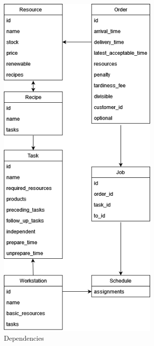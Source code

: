 \documentclass[a4paper,12pt,twoside]{scrreprt}
\begin{document}
\begin{figure}[H]
	\centering
	\includegraphics[width=8cm]{images/dependencies_v2}
	\caption{Dependencies}
	\label{fig:dependencies}
\end{figure}
\end{document}
